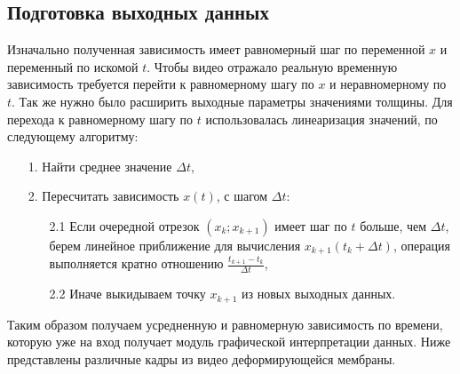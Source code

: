 \subsection{Подготовка выходных данных}
Изначально полученная зависимость имеет равномерный шаг по переменной $x$ и переменный по искомой $t$. Чтобы видео отражало реальную временную зависимость требуется перейти к равномерному шагу по $x$ и неравномерному по $t$.
Так же нужно было расширить выходные параметры значениями толщины. Для перехода к равномерному шагу по $t$ использовалась линеаризация значений, по следующему алгоритму:
\begin{itemize}
\item[1.] Найти среднее значение $\Delta t$,
\item[2.] Пересчитать зависимость $x(t)$, с шагом $\Delta t$:
\begin{itemize}
	\item[2.1] Если очередной отрезок $(x_k; x_{k+1})$ имеет шаг по $t$ больше, чем $\Delta t$, берем линейное приближение для вычисления $x_{k+1}(t_k+\Delta t)$, операция выполняется кратно отношению $\frac{t_{k+1}-t_k}{\Delta t}$,
	\item[2.2] Иначе выкидываем точку $x_{k+1}$ из новых выходных данных.
\end{itemize}
\end{itemize} 
Таким образом получаем усредненную и равномерную зависимость по времени, которую уже на вход получает модуль графической интерпретации данных. Ниже представлены различные 
кадры из видео деформирующейся мембраны.
		\begin{figure}[h!]	
				\def\svgwidth{\columnwidth}
				\caption{}				
				\label{animate1}
		\end{figure}

